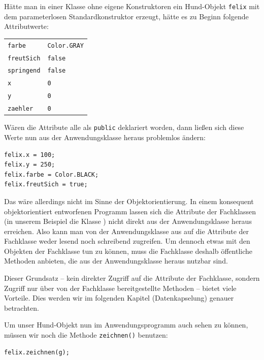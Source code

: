 Hätte man in einer Klasse ohne eigene Konstruktoren ein Hund-Objekt \lstinline|felix| mit
dem parameterlosen Standardkonstruktor erzeugt, hätte es zu Beginn folgende Attributwerte:

\begin{tabular}{ll}
\lstinline|farbe| & \lstinline|Color.GRAY| \\
\lstinline|freutSich| \hspace{5mm} & \lstinline|false| \\
\lstinline|springend| \hspace{5mm} & \lstinline|false| \\
\lstinline|x| & \lstinline|0| \\
\lstinline|y| & \lstinline|0| \\
\lstinline|zaehler| & \lstinline|0| \\
\end{tabular}

Wären die Attribute alle als \lstinline|public| deklariert worden, dann ließen sich
diese Werte nun aus der Anwendungsklasse heraus problemlos ändern:

\begin{lstlisting}
felix.x = 100;
felix.y = 250;
felix.farbe = Color.BLACK;
felix.freutSich = true;
\end{lstlisting}

Das wäre allerdings nicht im Sinne der Objektorientierung. In einem konsequent
objektorientiert entworfenen Programm lassen sich die Attribute der Fachklassen
(in unserem Beispiel die Klasse ) nicht direkt aus der Anwendungsklasse
heraus erreichen. Also kann man von der Anwendungsklasse aus auf die Attribute der
Fachklasse weder lesend noch schreibend zugreifen. Um dennoch etwas mit den Objekten
der Fachklasse tun zu können, muss die Fachklasse deshalb öffentliche Methoden
anbieten, die aus der Anwendungsklasse heraus nutzbar sind.

Dieser Grundsatz -- kein direkter Zugriff auf die Attribute der Fachklasse, sondern Zugriff nur
über von der Fachklasse bereitgestellte Methoden -- bietet viele Vorteile. Dies werden wir
im folgenden Kapitel (Datenkapselung) genauer betrachten.

Um unser Hund-Objekt nun im Anwendungsprogramm auch sehen zu können, müssen wir
noch die Methode \lstinline|zeichnen()| benutzen:

\begin{lstlisting}
felix.zeichnen(g);
\end{lstlisting}


